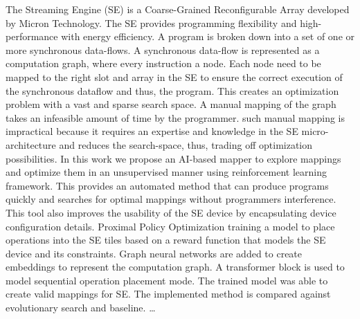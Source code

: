 The Streaming Engine (SE) is a Coarse-Grained Reconfigurable Array developed by Micron 
Technology.
The SE provides programming flexibility and high-performance with energy efficiency.
A program is broken down into a set of one or more synchronous data-flows.
A synchronous data-flow is represented as a computation graph, where every instruction a node.
Each node need to be mapped to the right slot and array in the SE to ensure the correct execution of the synchronous dataflow and thus, the program.
This creates an optimization problem with a vast and sparse search space.
A manual mapping of the graph takes an infeasible amount of time by the programmer.
such manual mapping is impractical because it requires an expertise and knowledge in the SE micro-architecture and reduces the search-space, thus, trading off optimization possibilities.
In this work we propose an AI-based mapper to explore mappings and optimize them in an unsupervised manner using reinforcement learning framework.
This provides an automated method that can produce programs quickly and searches for optimal mappings without programmers interference. 
This tool also improves the usability of the SE device by encapsulating device configuration details.
Proximal Policy Optimization training a model to place operations into the SE tiles based on a reward function that models the SE device and its constraints.
Graph neural networks are added to create embeddings to represent the computation graph.
A transformer block is used to model sequential operation placement mode. 
The trained model was able to create valid mappings for SE.
The implemented method is compared against evolutionary search and baseline.
\ldots{}